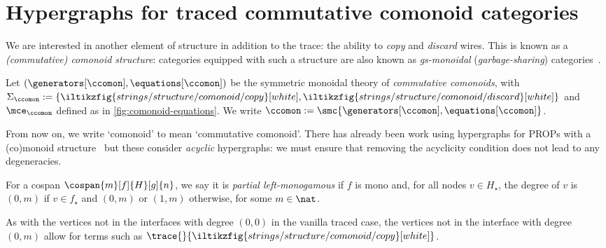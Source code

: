 \section{Hypergraphs for traced commutative comonoid categories}

We are interested in another element of structure in addition to the trace: the
ability to \emph{copy} and \emph{discard} wires.
This is known as a \emph{(commutative) comonoid structure}: categories equipped
with such a structure are also known as \emph{gs-monoidal}
(\emph{garbage-sharing}) categories~\cite{fritz2022free}.

\begin{definition}
    Let \((\generators[\ccomon], \equations[\ccomon])\) be the symmetric
    monoidal theory of \emph{commutative comonoids}, with \(\Sigma_\ccomon := \{
        \iltikzfig{strings/structure/comonoid/copy}[white],
        \iltikzfig{strings/structure/comonoid/discard}[white]
    \}\) and \(\mce_\ccomon\) defined as in
    \iftoggle{conf}{\cref{app:equations},}{}
    \cref{fig:comonoid-equations}.
    We write \(\ccomon := \smc{\generators[\ccomon], \equations[\ccomon]}\).
\end{definition}

From now on, we write `comonoid' to mean `commutative comonoid'.
There has already been work using hypergraphs for PROPs with a (co)monoid
structure~\cite{fritz2022free,milosavljevic2022string} but these consider
\emph{acyclic} hypergraphs: we must ensure that removing the acyclicity
condition does not lead to any degeneracies.

\begin{definition}
    For a cospan \(\cospan{m}[f]{H}[g]{n}\), we say it is
    \emph{partial left-monogamous} if \(f\) is mono and, for all nodes
    \(v \in H_\star\), the degree of \(v\) is \((0,m)\) if \(v \in f_\star\) and
    \((0,m)\) or \((1,m)\) otherwise, for some \(m \in \nat\).
\end{definition}

\begin{remark}
    As with the vertices not in the interfaces with degree \((0, 0)\) in the
    vanilla traced case, the vertices not in the interface with degree
    \((0, m)\) allow for terms such as \(
        \trace{}{\iltikzfig{strings/structure/comonoid/copy}[white]}
    \).
\end{remark}

